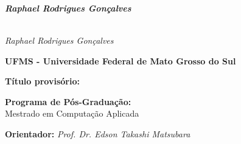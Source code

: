 \begin{titlepage}

\ \vfill

\begin{center}
\begin{minipage}[c]{12cm}
\begin{center}
\hrulefill\\
\vspace{.5cm} {\Large \titulo}\\
\vspace{1.3cm}

\textbf{\it Raphael Rodrigues Gon\c{c}alves}\\
\vspace{.5cm}
\hrulefill\\
\end{center}
\end{minipage}
\end{center}

\vfill

\cleardoublepage

\vspace*{2cm}
\begin{center}
{\huge\sf \titulo}

\vspace*{2cm}

{\it Raphael Rodrigues Gon\c{c}alves}

\vspace*{2cm}


\textbf{UFMS - Universidade Federal de Mato Grosso do Sul}

\vspace*{1cm}

\textbf{T\'itulo provis\'orio:} \titulo

\vspace*{1cm}

\textbf{Programa de P\'os-Gradua\c{c}\~ao:} \\
Mestrado em Computa\c{c}\~ao Aplicada

\vspace*{1cm}


{\bf Orientador:}  {\it Prof. Dr. Edson Takashi Matsubara}

\end{center}


\cleardoublepage



\end{titlepage}

